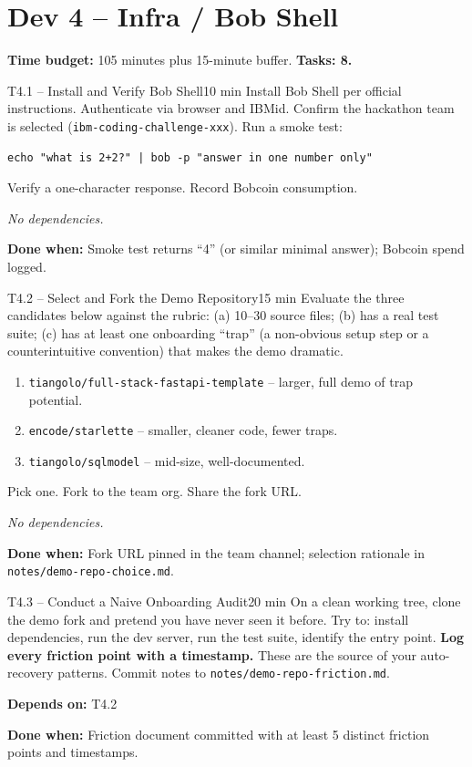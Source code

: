 \documentclass[11pt,letterpaper]{article}
\newcommand{\acceptance}[1]{\par\smallskip\textcolor{ibmgreen}{\textbf{Done when:}} #1}
\newcommand{\depends}[1]{\par\smallskip\textcolor{ibmorange}{\textbf{Depends on:}} #1}
\newcommand{\nodep}{\par\smallskip\textcolor{ibmgray}{\textit{No dependencies.}}}
\begin{document}
\section{Dev 4 -- Infra / Bob Shell}

\textbf{Time budget:} 105 minutes plus 15-minute buffer. \textbf{Tasks: 8.}

\begin{task}{T4.1 -- Install and Verify Bob Shell}{10 min}
Install Bob Shell per official instructions. Authenticate via browser and IBMid. Confirm the hackathon team is selected (\texttt{ibm-coding-challenge-xxx}). Run a smoke test:

\begin{lstlisting}
echo "what is 2+2?" | bob -p "answer in one number only"
\end{lstlisting}

Verify a one-character response. Record Bobcoin consumption.
\nodep
\acceptance{Smoke test returns ``4'' (or similar minimal answer); Bobcoin spend logged.}
\end{task}

\begin{task}{T4.2 -- Select and Fork the Demo Repository}{15 min}
Evaluate the three candidates below against the rubric: (a) 10--30 source files; (b) has a real test suite; (c) has at least one onboarding ``trap'' (a non-obvious setup step or a counterintuitive convention) that makes the demo dramatic.

\begin{enumerate}
  \item \texttt{tiangolo/full-stack-fastapi-template} -- larger, full demo of trap potential.
  \item \texttt{encode/starlette} -- smaller, cleaner code, fewer traps.
  \item \texttt{tiangolo/sqlmodel} -- mid-size, well-documented.
\end{enumerate}

Pick one. Fork to the team org. Share the fork URL.
\nodep
\acceptance{Fork URL pinned in the team channel; selection rationale in \texttt{notes/demo-repo-choice.md}.}
\end{task}

\begin{task}{T4.3 -- Conduct a Naive Onboarding Audit}{20 min}
On a clean working tree, clone the demo fork and pretend you have never seen it before. Try to: install dependencies, run the dev server, run the test suite, identify the entry point. \textbf{Log every friction point with a timestamp.} These are the source of your auto-recovery patterns. Commit notes to \texttt{notes/demo-repo-friction.md}.
\depends{T4.2}
\acceptance{Friction document committed with at least 5 distinct friction points and timestamps.}
\end{task}
\end{document}
